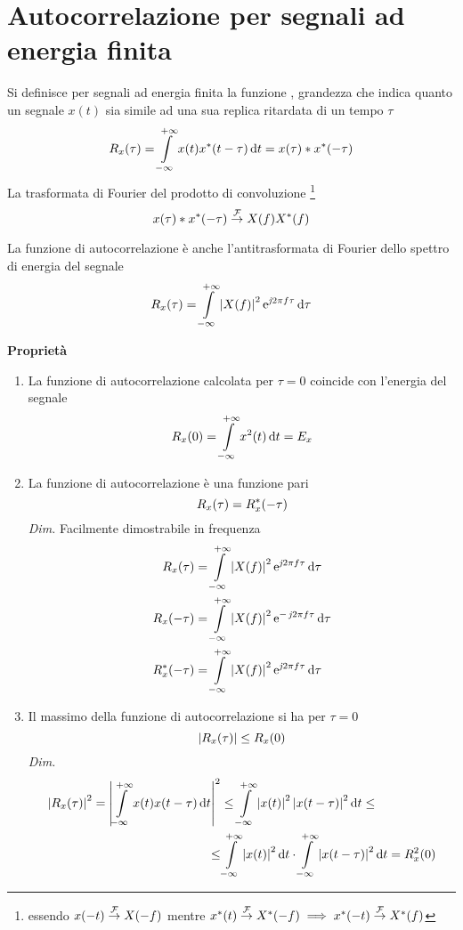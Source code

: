 \section{Autocorrelazione per segnali ad energia finita}
Si definisce per segnali ad energia finita la funzione , grandezza che indica quanto un segnale $x(t)$ sia simile ad una sua replica ritardata di un tempo $\tau$
\begin{equation}R_x(\tau)=\int\limits_{-\infty}^{+\infty}{x(t){x}^\ast(t-\tau)}{\,\mathop{}\!\mathrm{d}{t}}=x(\tau)\ast {x}^\ast(-\tau)\end{equation}
La trasformata di Fourier del prodotto di convoluzione \footnote{essendo $x(-t)\overset{\operatorname{\mathcal{F}}}{\to}X(-f)$ mentre ${x}^\ast(t)\overset{\operatorname{\mathcal{F}}}{\to}{X}^\ast(-f) \implies {x}^\ast(-t)\overset{\operatorname{\mathcal{F}}}{\to}{X}^\ast(f)$
}
\[x(\tau)\ast {x}^\ast(-\tau)\overset{\operatorname{\mathcal{F}}}{\to}X(f){X}^\ast(f)\]

La funzione di autocorrelazione è anche l'antitrasformata di Fourier dello spettro di energia del segnale
\begin{equation}
R_x(\tau)=\int\limits_{-\infty}^{+\infty}{\left|{X(f)}\right|^2\operatorname{e}^{\operatorname{\mathit{j}\!} 2\pi f\tau}}{\,\mathop{}\!\mathrm{d}{\tau}}
\end{equation}

\textbf{Proprietà}
\begin{enumerate}
\item La funzione di autocorrelazione calcolata per $\tau=0$ coincide con l'energia del segnale
\[R_x(0)=\int\limits_{-\infty}^{+\infty}{x^2(t)}{\,\mathop{}\!\mathrm{d}{t}}=E_x\]
\item La funzione di autocorrelazione è una funzione pari
\[R_x(\tau)=R_{x}^\ast(-\tau)\]
\emph{Dim.} Facilmente dimostrabile in frequenza
\[\begin{split}R_x(\tau)&=\int\limits_{-\infty}^{+\infty}{\left|{X(f)}\right|^2\operatorname{e}^{\operatorname{\mathit{j}\!} 2\pi f\tau}}{\,\mathop{}\!\mathrm{d}{\tau}}\\
R_x(-\tau)&=\int\limits_{-\infty}^{+\infty}{\left|{X(f)}\right|^2\operatorname{e}^{-\operatorname{\mathit{j}\!} 2\pi f\tau}}{\,\mathop{}\!\mathrm{d}{\tau}}\\
R_{x}^\ast(-\tau)&=\int\limits_{-\infty}^{+\infty}{\left|{X(f)}\right|^2\operatorname{e}^{\operatorname{\mathit{j}\!} 2\pi f\tau}}{\,\mathop{}\!\mathrm{d}{\tau}}\end{split}\]
\item Il massimo della funzione di autocorrelazione si ha per $\tau=0$
\[\left|{R_x(\tau)}\right|\leq R_x(0)\]
\emph{Dim.}
\[\begin{split}\left|{R_x(\tau)}\right|^2=\left|{\int\limits_{-\infty}^{+\infty}{x(t)x(t-\tau)}{\,\mathop{}\!\mathrm{d}{t}}}\right|^2&\leq\int\limits_{-\infty}^{+\infty}{\left|{x(t)}\right|^2\left|{x(t-\tau)}\right|^2}{\,\mathop{}\!\mathrm{d}{t}}\leq\\\leq&\int\limits_{-\infty}^{+\infty}{\left|{x(t)}\right|^2}{\,\mathop{}\!\mathrm{d}{t}}\cdot\int\limits_{-\infty}^{+\infty}{\left|{x(t-\tau)}\right|^2}{\,\mathop{}\!\mathrm{d}{t}}=R_x^2(0)\end{split}\]
\end{enumerate}

